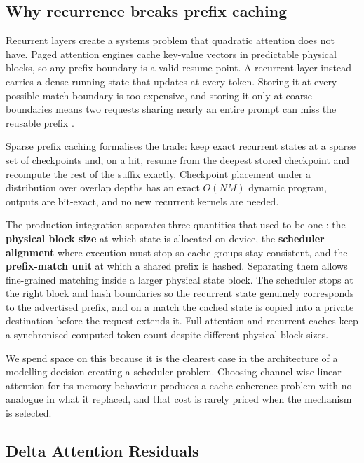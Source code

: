 \documentclass[11pt]{article}
\begin{document}
\subsection{Why recurrence breaks prefix caching}

Recurrent layers create a systems problem that quadratic attention does not have. Paged attention engines cache key-value vectors in predictable physical blocks, so any prefix boundary is a valid resume point. A recurrent layer instead carries a dense running state that updates at every token. Storing it at every possible match boundary is too expensive, and storing it only at coarse boundaries means two requests sharing nearly an entire prompt can miss the reusable prefix \cite{vllm2026k3}.

Sparse prefix caching \cite{shirokikh2026sparseprefix} formalises the trade: keep exact recurrent states at a sparse set of checkpoints and, on a hit, resume from the deepest stored checkpoint and recompute the rest of the suffix exactly. Checkpoint placement under a distribution over overlap depths has an exact $O(NM)$ dynamic program, outputs are bit-exact, and no new recurrent kernels are needed.

The production integration separates three quantities that used to be one \cite{vllm2026k3}: the \textbf{physical block size} at which state is allocated on device, the \textbf{scheduler alignment} where execution must stop so cache groups stay consistent, and the \textbf{prefix-match unit} at which a shared prefix is hashed. Separating them allows fine-grained matching inside a larger physical state block. The scheduler stops at the right block and hash boundaries so the recurrent state genuinely corresponds to the advertised prefix, and on a match the cached state is copied into a private destination before the request extends it. Full-attention and recurrent caches keep a synchronised computed-token count despite different physical block sizes.

We spend space on this because it is the clearest case in the architecture of a modelling decision creating a scheduler problem. Choosing channel-wise linear attention for its memory behaviour produces a cache-coherence problem with no analogue in what it replaced, and that cost is rarely priced when the mechanism is selected.

\subsection{Delta Attention Residuals}
\end{document}
